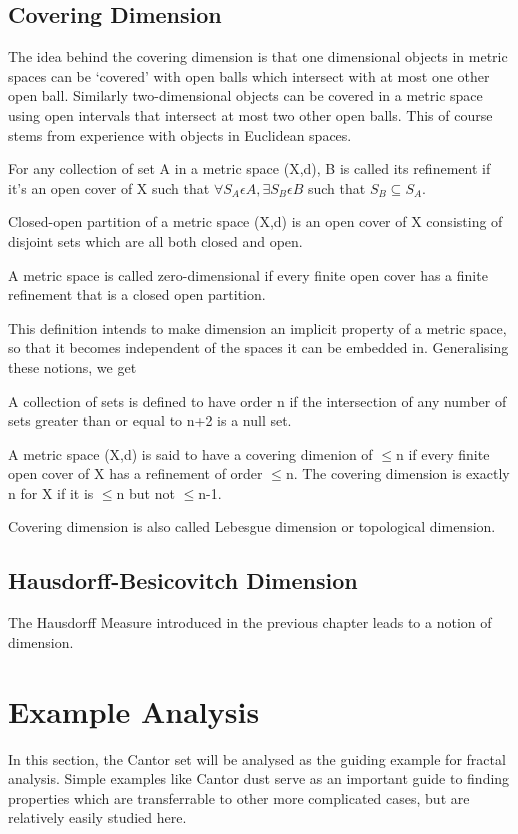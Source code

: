 \subsection{Covering Dimension}
The idea behind the covering dimension is that one dimensional objects in
metric spaces can be `covered' with open balls which intersect with at most
one other open ball. Similarly two-dimensional objects can be covered in a
metric space using open intervals that intersect at most two other open
balls. This of course stems from experience with objects in Euclidean spaces.
\begin{definition}
    For any collection of set A in a metric space (X,d), B is called its
    refinement if it's an open cover of X such that $\forall S_A \epsilon A,
    \exists S_B \epsilon B$ such that $ S_B \subseteq S_A$.
\end{definition}
\begin{definition}
    Closed-open partition of a metric space (X,d) is an open cover of X
    consisting of disjoint sets which are all both closed and open.
\end{definition}
\begin{definition}
    A metric space is called zero-dimensional if every finite open cover has a
    finite refinement that is a closed open partition.
\end{definition}
This definition intends to make dimension an implicit property of a metric
space, so that it becomes independent of the spaces it can be embedded in.
Generalising these notions, we get
\begin{definition}
    A collection of sets is defined to have order n if the intersection of any
    number of sets greater than or equal to n+2 is a null set.
\end{definition}
\begin{definition}
    A metric space (X,d) is said to have a covering dimenion of $\leqslant$n if
    every finite open cover of X has a refinement of order $\leqslant$n. The
    covering dimension is exactly n for X if it is $\leqslant$n but not
    $\leqslant$n-1.
\end{definition}
Covering dimension is also called Lebesgue dimension or topological dimension.

\subsection{Hausdorff-Besicovitch Dimension}
The Hausdorff Measure introduced in the previous chapter leads to a notion of
dimension.


\section{Example Analysis}
In this section, the Cantor set will be analysed as the guiding example for
fractal analysis.
Simple examples like Cantor dust serve as an important guide to finding
properties which are transferrable to other more complicated cases, but are
relatively easily studied here.
